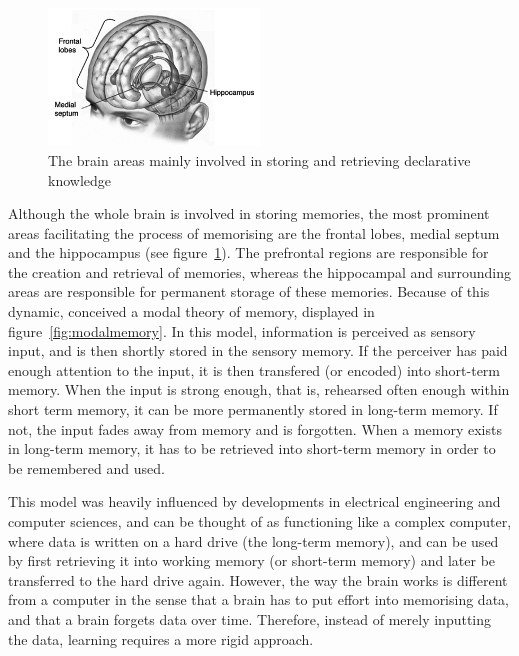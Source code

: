 \begin{figure}
    \centering
    \includegraphics[width=0.5\textwidth]{img/brainareas.png}
    \caption{The brain areas mainly involved in storing and retrieving declarative knowledge \protect\cite{amnesia}}
    \label{fig:brainareas}
\end{figure}

Although the whole brain is involved in storing memories, the most prominent areas facilitating the process of memorising are the frontal lobes, medial septum and the hippocampus \cite{cognitivepsychology} (see figure~\ref{fig:brainareas}). The prefrontal regions are responsible for the creation and retrieval of memories, whereas the hippocampal and surrounding areas are responsible for permanent storage of these memories. Because of this dynamic,  conceived a modal theory of memory, displayed in figure~\ref{fig:modalmemory}. In this model, information is perceived as sensory input, and is then shortly stored in the sensory memory. If the perceiver has paid enough attention to the input, it is then transfered (or encoded) into short-term memory. When the input is strong enough, that is, rehearsed often enough within short term memory, it can be more permanently stored in long-term memory. If not, the input fades away from memory and is forgotten. When a memory exists in long-term memory, it has to be retrieved into short-term memory in order to be remembered and used.

This model was heavily influenced by developments in electrical engineering and computer sciences, and can be thought of as functioning like a complex computer, where data is written on a hard drive (the long-term memory), and can be used by first retrieving it into working memory (or short-term memory) and later be transferred to the hard drive again. However, the way the brain works is different from a computer in the sense that a brain has to put effort into memorising data, and that a brain forgets data over time. Therefore, instead of merely inputting the data, learning requires a more rigid approach.

